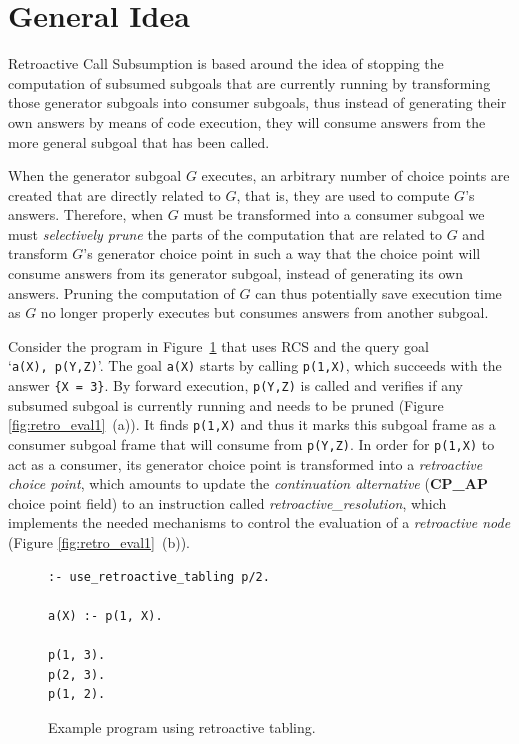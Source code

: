 \section{General Idea}

Retroactive Call Subsumption is based around the idea of stopping the computation of subsumed subgoals
that are currently running by transforming those generator subgoals into consumer subgoals, thus instead
of generating their own answers by means of code execution, they will consume answers from the more general
subgoal that has been called.

When the generator subgoal $G$ executes, an arbitrary number of choice points are created that are directly related
to $G$, that is, they are used to compute $G$'s answers. Therefore, when $G$
must be transformed into a consumer subgoal we must \textit{selectively prune} the parts of the computation
that are related to $G$ and transform $G$'s generator choice point in such a way that the choice point
will consume answers from its generator subgoal, instead of generating its own answers.
Pruning the computation of $G$ can thus potentially save execution time as $G$ no longer properly executes
but consumes answers from another subgoal.

Consider the program in Figure~\ref{fig:retro_program1} that uses RCS and the query goal `\texttt{a(X),~p(Y,Z)}'.
The goal \texttt{a(X)} starts by calling \texttt{p(1,X)}, which succeeds with the answer \texttt{\{X~=~3\}}.
By forward execution, \texttt{p(Y,Z)} is called and verifies if any subsumed subgoal is currently running
and needs to be pruned (Figure \ref{fig:retro_eval1}~(a)). It finds \texttt{p(1,X)} and thus it marks this subgoal frame as a consumer subgoal
frame that will consume from \texttt{p(Y,Z)}.
In order for \texttt{p(1,X)} to act as a consumer, its generator choice point is transformed into
a \textit{retroactive choice point}, which amounts to update the \textit{continuation alternative}
(\textbf{CP\_AP} choice point field) to an instruction called \textit{retroactive\_resolution},
which implements the needed mechanisms to control the evaluation of a \textit{retroactive node}
(Figure \ref{fig:retro_eval1}~(b)).

\begin{figure}[ht]
\begin{Verbatim}
:- use_retroactive_tabling p/2.

a(X) :- p(1, X).

p(1, 3).
p(2, 3).
p(1, 2).
\end{Verbatim}
\caption{Example program using retroactive tabling.}
\label{fig:retro_program1}
\end{figure}

